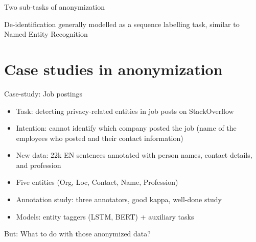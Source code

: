 \documentclass[12pt,aspectratio=169,handout]{beamer}
\begin{document}
\begin{frame}{Two sub-tasks of anonymization}

De-identification generally modelled as a sequence labelling task, similar to Named Entity Recognition


\end{frame}

\section{Case studies in anonymization}

\begin{frame}{Case-study: Job postings}

\begin{itemize}
\item Task: detecting privacy-related entities in job posts on StackOverflow
\item Intention: cannot identify which company posted the job (name of the employees who posted and their contact information)
\item New data: 22k EN sentences annotated with person names, contact details, and profession
\item Five entities (Org, Loc, Contact, Name, Profession)
\item Annotation study: three annotators, good kappa, well-done study
\item Models: entity taggers (LSTM, BERT) + auxiliary tasks
\end{itemize}

But: What to do with those anonymized data?


\end{frame}
\end{document}
